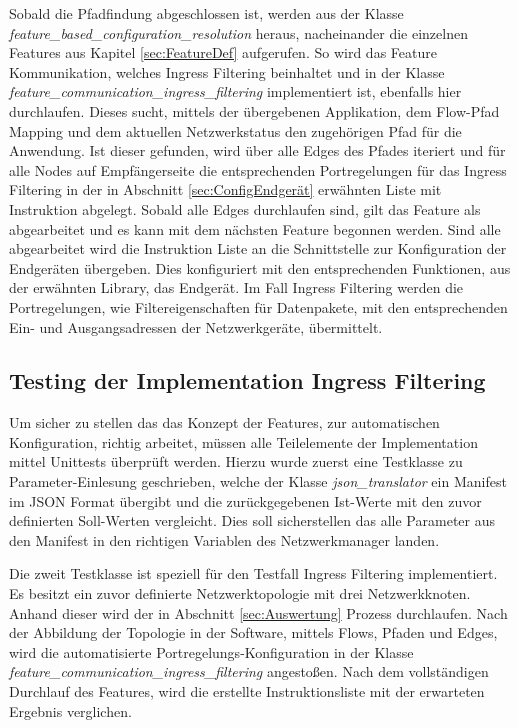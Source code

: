 
\newpage

Sobald die Pfadfindung abgeschlossen ist, werden aus der Klasse \newline\emph{feature\_based\_configuration\_resolution} heraus, nacheinander die einzelnen Features aus Kapitel \ref{sec:FeatureDef} aufgerufen. So wird das Feature Kommunikation, welches Ingress Filtering beinhaltet und in der Klasse \newline \emph{feature\_communication\_ingress\_filtering} implementiert ist, ebenfalls hier durchlaufen. Dieses sucht, mittels der übergebenen Applikation, dem Flow-Pfad Mapping und dem aktuellen Netzwerkstatus den zugehörigen Pfad für die Anwendung. Ist dieser gefunden, wird über alle Edges des Pfades iteriert und für alle Nodes auf Empfängerseite die entsprechenden Portregelungen für das Ingress Filtering in der in Abschnitt \ref{sec:ConfigEndgerät} erwähnten Liste mit Instruktion abgelegt. Sobald alle Edges durchlaufen sind, gilt das Feature als abgearbeitet und es kann mit dem nächsten Feature begonnen werden. Sind alle abgearbeitet wird die Instruktion Liste an die Schnittstelle zur Konfiguration der Endgeräten übergeben. Dies konfiguriert mit den entsprechenden Funktionen, aus der erwähnten Library, das Endgerät. Im Fall Ingress Filtering werden die Portregelungen, wie Filtereigenschaften für Datenpakete, mit den entsprechenden Ein- und Ausgangsadressen der Netzwerkgeräte, übermittelt.



\subsection{Testing der Implementation Ingress Filtering}
Um sicher zu stellen das das Konzept der Features, zur automatischen Konfiguration, richtig arbeitet, müssen alle Teilelemente der Implementation mittel Unittests überprüft werden. Hierzu wurde zuerst eine Testklasse zu Parameter-Einlesung geschrieben, welche der Klasse \emph{json\_translator} ein Manifest im \ac{JSON} Format übergibt und die zurückgegebenen Ist-Werte mit den zuvor definierten Soll-Werten vergleicht. Dies soll sicherstellen das alle Parameter aus den Manifest in den richtigen Variablen des Netzwerkmanager landen. 

Die zweit Testklasse ist speziell für den Testfall Ingress Filtering implementiert. Es besitzt ein zuvor definierte Netzwerktopologie mit drei Netzwerkknoten. Anhand dieser wird der in Abschnitt \ref{sec:Auswertung} Prozess durchlaufen. Nach der Abbildung der Topologie in der Software, mittels Flows, Pfaden und Edges, wird die automatisierte Portregelungs-Konfiguration in der Klasse \emph{feature\_communication\_ingress\_filtering} angestoßen. Nach dem vollständigen Durchlauf des Features, wird die erstellte Instruktionsliste mit der erwarteten Ergebnis verglichen.

